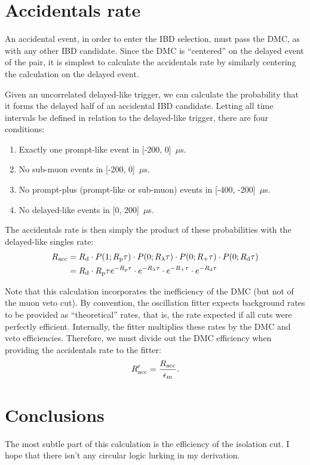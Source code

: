 \documentclass[../thesis.tex]{subfiles}
\begin{document}
\section{Accidentals rate}
\label{sec:accratecalc}

An accidental event, in order to enter the IBD selection, must pass the DMC, as
with any other IBD candidate. Since the DMC is ``centered'' on the delayed event
of the pair, it is simplest to calculate the accidentals rate by similarly
centering the calculation on the delayed event.

Given an uncorrelated delayed-like trigger, we can calculate the probability
that it forms the delayed half of an accidental IBD candidate. Letting all time
intervals be defined in relation to the delayed-like trigger, there are four
conditions:
\begin{enumerate}
\item Exactly one prompt-like event in [-200, 0]~$\mu$s.
\item No sub-muon events in [-200, 0]~$\mu$s.
\item No prompt-plus (prompt-like or sub-muon) events in [-400, -200]~$\mu$s.
\item No delayed-like events in [0, 200]~$\mu$s.
\end{enumerate}
The accidentals rate is then simply the product of these probabilities with the
delayed-like singles rate:
\begin{align}
  R_\mathrm{acc} &= R_\mathrm{d} \cdot P(1; R_\mathrm{p} \tau)\cdot P(0; R_\mathrm{\lambda} \tau)
          \cdot P(0; R_\mathrm{+} \tau)\cdot P(0; R_\mathrm{d} \tau) \nonumber \\
        &= R_\mathrm{d}\cdot R_\mathrm{p}\tau e^{-R_\mathrm{p}\tau}\cdot e^{-R_\mathrm{\lambda}\tau}
          \cdot e^{-R_\mathrm{+}\tau} \cdot e^{-R_\mathrm{d}\tau}
\end{align}

Note that this calculation incorporates the inefficiency of the DMC (but not of
the muon veto cut). By convention, the oscillation fitter expects background
rates to be provided as ``theoretical'' rates, that is, the rate expected if all
cuts were perfectly efficient. Internally, the fitter multiplies these rates by
the DMC and veto efficiencies. Therefore, we must divide out the DMC efficiency
when providing the accidentals rate to the fitter:
\begin{equation}
  R_\mathrm{acc}' = \frac{R_\mathrm{acc}}{\epsilon_\mathrm{m}}.
\end{equation}

\section{Conclusions}
\label{sec:accdmcconcl}

The most subtle part of this calculation is the efficiency of the isolation cut.
I hope that there isn't any circular logic lurking in my derivation.
\end{document}
